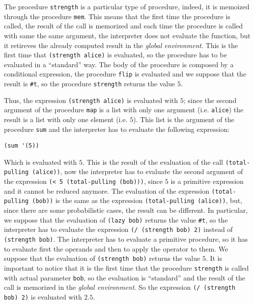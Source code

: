 \begin{itemize}
        The procedure \texttt{strength} is a particular type of procedure, indeed, it is memoized through the procedure \texttt{mem}.
        This means that the first time the procedure is called, the result of the call is memorized and each time the procedure is
        called with same the same argument, the interpreter does not evaluate the function, but it retireves the already computed
        result in the \textit{global environment}. This is the first time that \texttt{(strength \textquotesingle alice)} is evaluated, 
        so the procedure has to be evaluated in a ``standard'' way.
        The body of the procedure is composed by a conditional expression, the procedure \texttt{flip} is evaluated and we suppose
        that the result is \texttt{\#t}, so the procedure \texttt{strength} returns the value $5$.

        Thus, the expression \texttt{(strength \textquotesingle alice)} is evaluated with $5$; since the second argument of the procedure \texttt{map}
        is a list with only one argument (i.e. \texttt{\textquotesingle alice}) the result is a list with only one element (i.e. $5$).
        This list is the argument of the procedure \texttt{sum} and the interpreter has to evaluate the following expression:
        \begin{lstlisting}[caption={Expression to be evaluated after evaluating the expression in Listing~\ref{lst:map}}, captionpos=b]
(sum '(5))
        \end{lstlisting}
        Which is evaluated with $5$. This is the result of the evaluation of the call \texttt{(total-pulling \textquotesingle (alice))}, now the
        interpreter has to evaluate the second argument of the expression \texttt{(< 5 (total-pulling \textquotesingle (bob)))}, since $5$ is 
        a primitive expression and it cannot be reduced anymore.
        The evaluation of the expression \texttt{(total-pulling \textquotesingle (bob))} is the same as the expression 
        \texttt{(total-pulling \textquotesingle (alice))}, but, since there are some probabilistic cases, the result can be different. In particular,
        we suppose that the evaluation of \texttt{(lazy \textquotesingle bob)} returns the value \texttt{\#t}, so the interpreter has to evaluate the
        expression \texttt{(/ (strength \textquotesingle bob) 2)} instead of \texttt{(strength \textquotesingle bob)}. The interpreter has to evaluate a primitive
        procedure, so it has to evaluate first the operands and then to apply the operator to them.
        We suppose that the evaluation of \texttt{(strength \textquotesingle bob)} returns the value $5$. It is important to notice that it is the
        first time that the procedure \texttt{strength} is called with actual parameter \texttt{\textquotesingle bob}, so the evaluation is
        ``standard'' and the result of the call is memorized in the \textit{global environment}. 
        So the expression \texttt{(/ (strength \textquotesingle bob) 2)} is evaluated with $2.5$.


\end{itemize}

